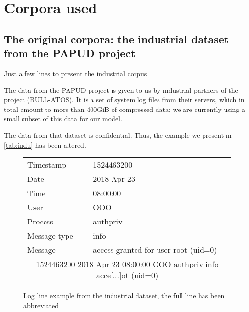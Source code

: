 \chapter{Corpora used}

\section{The original corpora: the industrial dataset from the PAPUD project}
Just a few lines to present the industrial corpus

The data from the PAPUD project is given to us by industrial partners of the project (BULL-ATOS). It is a set of system log files from their servers, which in total amount to more than 400GiB of compressed data; we are currently using a small subset of this data for our model.

The data from that dataset is confidential. Thus, the example we present in \autoref{tab:indu} has been altered.


\begin{figure}[!h]
	\begin{center}
		
		\begin{tabularx}{.9\textwidth}{|X|X|}
			\hline 
			Timestamp & 1524463200\\
			Date &2018 Apr 23\\
			Time &08:00:00\\
			User&OOO\\
			Process &authpriv\\
			Message type&info\\
			Message& access granted for user root (uid=0)\\ 
			\hline 
			\multicolumn{2}{|c|}{1524463200 2018 Apr 23 08:00:00 OOO authpriv info acce[...]ot (uid=0)} \\ 
			\hline 
		\end{tabularx} 
	\end{center}
	\caption{Log line example from the industrial dataset, the full line has been abbreviated \label{tab:indu}}
\end{figure}

